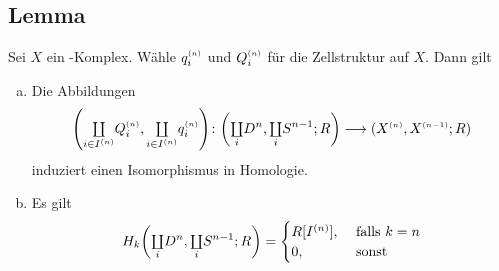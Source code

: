 \subsection[Lemma über $\enbrace{\coprod Q_i^\ssbrace{n}, \coprod q_i^\ssbrace{n}}_* $ und $H_k \enbrace{\coprod_i D^n, \coprod_i S^{n-1};R}$]{Lemma} %
\label{sub:125}
Sei $X$ ein \CW-Komplex. Wähle $q_i^{\scriptscriptstyle(n)}$ und $Q_i^{\scriptscriptstyle(n)}$ für die Zellstruktur auf $X$. Dann gilt
\begin{enumerate}[a)]
	\item Die Abbildungen
	\[
		\enbrace*{{\textstyle\coprod\limits_{i \in I^{(n)}}} Q_i^\ssbrace{n}, {\textstyle\coprod\limits_{i \in I^{(n)}}} q_i^\ssbrace{n}} 
		\colon \enbrace*{{\textstyle\coprod\limits_i} D^n, {\textstyle\coprod\limits_i} S^{n-1};R}  \longrightarrow
		\enbrace*{X^\ssbrace{n}, X^\ssbrace{n-1};R} 
	\]
	induziert einen Isomorphismus in Homologie.
	\item Es gilt
	\[
		H_k \enbrace*{{\textstyle\coprod\limits_i} D^n, {\textstyle\coprod\limits_i} S^{n-1};R} = \begin{cases}
			R[I^{(n)}], &\text{ falls }k=n\\
			0, & \text{ sonst}
		\end{cases}
	\] 
\end{enumerate}
